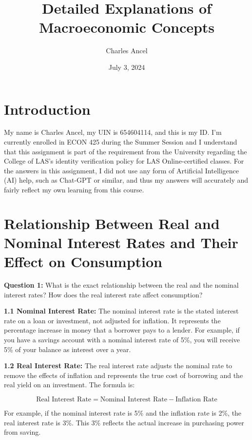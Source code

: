 \documentclass{article}
\title{Detailed Explanations of Macroeconomic Concepts}
\author{Charles Ancel}
\date{July 3, 2024}
\begin{document}
\maketitle

\section{Introduction}
My name is Charles Ancel, my UIN is 654604114, and this is my ID. I'm currently
enrolled in ECON 425 during the Summer Session and I understand that this
assignment is part of the requirement from the University regarding the College
of LAS's identity verification policy for LAS Online-certified classes. For the
answers in this assignment, I did not use any form of Artificial Intelligence (AI)
help, such as Chat-GPT or similar, and thus my answers will accurately and fairly
reflect my own learning from this course.

\hrulefill

\section{Relationship Between Real and Nominal Interest Rates and Their Effect on Consumption}

\textbf{Question 1:} What is the exact relationship between the real and the nominal interest rates? How does the real interest rate affect consumption?

\textbf{1.1 Nominal Interest Rate:} The nominal interest rate is the stated interest rate on a loan or investment, not adjusted for inflation. It represents the percentage increase in money that a borrower pays to a lender. For example, if you have a savings account with a nominal interest rate of 5\%, you will receive 5\% of your balance as interest over a year.

\textbf{1.2 Real Interest Rate:} The real interest rate adjusts the nominal rate to remove the effects of inflation and represents the true cost of borrowing and the real yield on an investment. The formula is:

\begin{equation*}
    \text{Real Interest Rate} = \text{Nominal Interest Rate} - \text{Inflation Rate}
\end{equation*}

For example, if the nominal interest rate is 5\% and the inflation rate is 2\%, the real interest rate is 3\%. This 3\% reflects the actual increase in purchasing power from saving.
\end{document}
